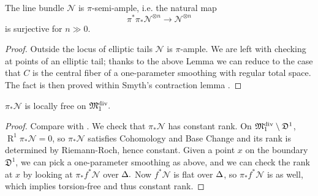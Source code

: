 \begin{lem}\label{lemma:semiample}
The line bundle $\mathcal N$ is $\pi$-semi-ample, i.e. the natural map
\[\pi^*\pi_*\mathcal N^{\otimes n}\to \mathcal N^{\otimes n}\]
is surjective for $n\gg 0$.
\end{lem}
\begin{proof}
Outside the locus of elliptic tails $\mathcal N$ is $\pi$-ample. We are left with checking at points of an elliptic tail; thanks to the above Lemma we can reduce to the case that $C$ is the central fiber of a one-parameter smoothing with regular total space. The fact is then proved within Smyth's contraction lemma \cite[Lemma~2.12]{SMY1}.
\end{proof}

\begin{lem}
$\pi_*\mathcal N$ is locally free on $\mathfrak M_1^{\rm{div}}.$
\end{lem}
\begin{proof} Compare with \cite[Proposition~3.7.2.1]{RSPW}.
We check that $\pi_*\mathcal N$ has constant rank.
On $\mathfrak M_1^{\rm{div}}\setminus \mathfrak{D}^1$, $\operatorname{R}^1\pi_*\mathcal N=0$, so $\pi_*\mathcal N$ satisfies Cohomology and Base Change \cite[Theorem III.12.11]{HAR} and its rank is determined by Riemann-Roch, hence constant.
Given a point $x$ on the boundary $\mathfrak{D}^1$, we can pick a one-parameter smoothing as above, and we can check the rank at $x$ by looking at $\pi_*f^*\mathcal N$ over $\Delta.$ Now $f^*\mathcal N$ is flat over $\Delta$, so $\pi_*f^*\mathcal N$ is as well, which implies torsion-free and thus constant rank.
\end{proof}

